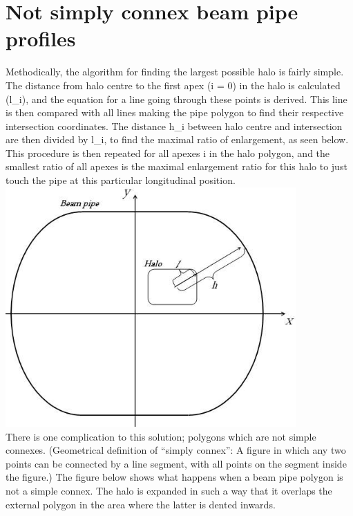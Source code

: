 \section{Not simply connex beam pipe profiles} 
Methodically, the algorithm for finding the largest possible halo is
fairly simple. The distance from halo centre to the first apex (i = 0)
in the halo is calculated (l\_i), and the equation for a line going
through these points is derived. This line is then compared with all
lines making the pipe polygon to find their respective intersection
coordinates. The distance h\_i between halo centre and intersection are
then divided by l\_i, to find the maximal ratio of enlargement, as seen
below. This procedure is then repeated for all apexes i in the halo
polygon, and the smallest ratio  of all apexes is the maximal
enlargement ratio for this halo to just touch the pipe at this
particular longitudinal position. 
\\
\includegraphics[width=420px]{Introduction/notsimple0.jpg}
\\  
There is one complication to this solution; polygons which are not
simple connexes. (Geometrical definition of ``simply connex'': A figure
in which any two points can be connected by a line segment, with all
points on the segment inside the figure.) The figure below shows what
happens when a beam pipe polygon is not a simple connex. The halo is
expanded in such a way that it overlaps the external polygon in the area
where the latter is dented inwards. 
\\
